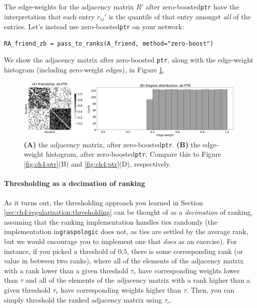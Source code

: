 The edge-weights for the adjacency matrix $R'$ after zero-boosted\texttt{ptr} have the interpretation that each entry $r_{ij}'$ is the quantile of that entry amongst \emph{all} of the entries. Let's instead use zero-boosted\texttt{ptr} on your network:

\begin{lstlisting}[style=python]
RA_friend_zb = pass_to_ranks(A_friend, method="zero-boost")
\end{lstlisting}
We show the adjacency matrix after zero-boosted \texttt{ptr}, along with the edge-weight histogram (including zero-weight edges), in Figure \ref{fig:ch4:ptr_zb}.

\begin{figure}[h]
    \centering
    \includegraphics[width=\linewidth]{representations/ch4/Images/ptr_zb.png}
    \caption[Zero-Boosted PTR]{\textbf{(A)} the adjacency matrix, after zero-boosted\texttt{ptr}. \textbf{(B)} the edge-weight histogram, after zero-boosted\texttt{ptr}. Compare this to Figure \ref{fig:ch4:ptr}(B) and \ref{fig:ch4:ptr}(D), respectively.}
    \label{fig:ch4:ptr_zb}
\end{figure}

\paragraph{Thresholding as a decimation of ranking}
As it turns out, the thresholding approach you learned in Section \ref{sec:ch4:regularization:thresholding} can be thought of as a \emph{decimation} of ranking, assuming that the ranking implementation handles ties randomly (the implementation in\texttt{graspologic} does not, as ties are settled by the average rank, but we would encourage you to implement one that \emph{does} as an exercise). For instance, if you picked a threshold of $0.5$, there is some corresponding rank (or value in between two ranks), where all of the elements of the adjacency matrix with a rank lower than a given threshold $\tau_r$ have corresponding weights lower than $\tau$ and all of the elements of the adjacency matrix with a rank higher than a given threshold $\tau_r$ have corresponding weights higher than $\tau$. Then, you can simply threshold the ranked adjacency matrix using $\tau_r$.


